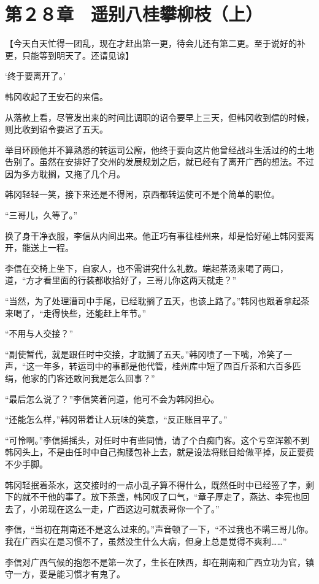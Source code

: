 \section{第２８章　遥别八桂攀柳枝（上）}

【今天白天忙得一团乱，现在才赶出第一更，待会儿还有第二更。至于说好的补更，只能等到明天了。还请见谅】

‘终于要离开了。’

韩冈收起了王安石的来信。

从落款上看，尽管发出来的时间比调职的诏令要早上三天，但韩冈收到信的时候，则比收到诏令要迟了五天。

举目环顾他并不算熟悉的转运司公廨，他终于要向这片他曾经战斗生活过的的土地告别了。虽然在安排好了交州的发展规划之后，就已经有了离开广西的想法。不过因为多方耽搁，又拖了几个月。

韩冈轻轻一笑，接下来还是不得闲，京西都转运使可不是个简单的职位。

“三哥儿，久等了。”

换了身干净衣服，李信从内间出来。他正巧有事往桂州来，却是恰好碰上韩冈要离开，能送上一程。

李信在交椅上坐下，自家人，也不需讲究什么礼数。端起茶汤来喝了两口，道，“方才看里面的行装都收拾好了，三哥儿你这两天就走？”

“当然，为了处理漕司中手尾，已经耽搁了五天，也该上路了。”韩冈也跟着拿起茶来喝了，“走得快些，还能赶上年节。”

“不用与人交接？”

“副使暂代，就是跟任时中交接，才耽搁了五天。”韩冈啧了一下嘴，冷笑了一声，“这一年多，转运司中的事都是他代管，桂州库中短了四百斤茶和六百多匹绢，他家的门客还敢问我是怎么回事？”

“最后怎么说了？”李信笑着问道，他可不会为韩冈担心。

“还能怎么样，”韩冈带着让人玩味的笑意，“反正账目平了。”

“可怜啊。”李信摇摇头，对任时中有些同情，请了个白痴门客。这个亏空浑赖不到韩冈头上，不是由任时中自己掏腰包补上去，就是设法将账目给做平掉，反正要费不少手脚。

韩冈轻抿着茶水，这交接时的一点小乱子算不得什么，既然任时中已经签了字，剩下的就不干他的事了。放下茶盏，韩冈叹了口气，“章子厚走了，燕达、李宪也回去了，小弟现在这么一走，广西这边可就表哥你一个了。”

李信，“当初在荆南还不是这么过来的。”声音顿了一下，“不过我也不瞒三哥儿你。我在广西实在是习惯不了，虽然没生什么大病，但身上总是觉得不爽利……”

李信对广西气候的抱怨不是第一次了，生长在陕西，却在荆南和广西立功为官，镇守一方，要是能习惯才有鬼了。

